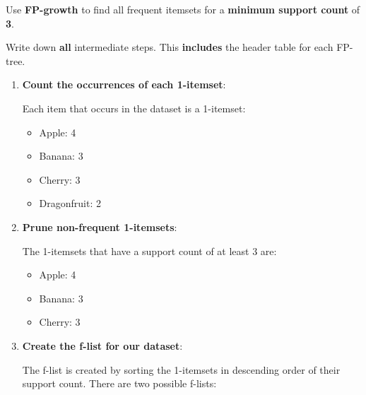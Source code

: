 \documentclass[
english,
smallborders
]{i6prcsht}
\begin{document}
Use \textbf{FP-growth} to find all frequent itemsets for a \textbf{minimum support count} of \textbf{3}.

Write down \textbf{all} intermediate steps. This \textbf{includes} the header table for each FP-tree.

\begin{solution}
	\newcommand{\fptreerootnode}{
		\begin{tikzpicture}
			\node[draw, fill=white, minimum height = 0.65cm, minimum width=2.25cm] at (0,-1) (Label) {$\{\}$};
		\end{tikzpicture}
	}

	\newcommand{\fptreenodewithoccurences}[2]{
		\begin{tikzpicture}
			\node[draw, fill=white, minimum height = 0.65cm, minimum width=1.75cm] at (0,-1) (Label) {$#1$};
			\node[draw, fill=white, minimum height = 0.65cm, minimum width=0.5cm, right = 0cm of Label] {$#2$};
		\end{tikzpicture}
	}

	\begin{enumerate}
		\item \textbf{Count the occurrences of each 1-itemset}:

		      Each item that occurs in the dataset is a 1-itemset:

		      \begin{itemize}
			      \item Apple: 4
			      \item Banana: 3
			      \item Cherry: 3
			      \item Dragonfruit: 2
		      \end{itemize}

		\item \textbf{Prune non-frequent 1-itemsets}:

		      The 1-itemsets that have a support count of at least 3 are:

		      \begin{itemize}
			      \item Apple: 4
			      \item Banana: 3
			      \item Cherry: 3
		      \end{itemize}

		\item \textbf{Create the f-list for our dataset}:

		      The f-list is created by sorting the 1-itemsets in descending order of their support count. There are two possible f-lists:


\end{enumerate}
\end{solution}
\end{document}
